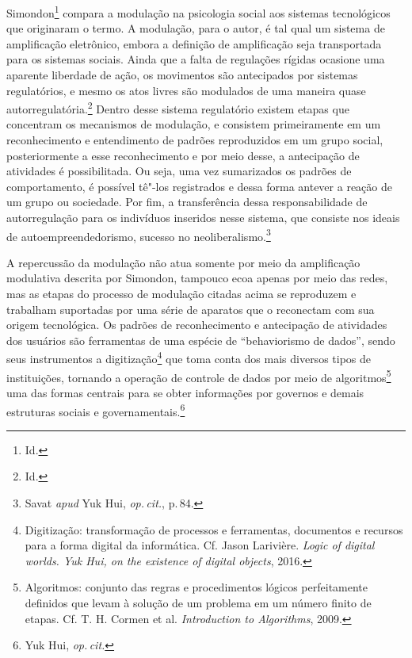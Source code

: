 Simondon\footnote{Id.} compara a modulação na psicologia social
aos sistemas tecnológicos que originaram o termo. A modulação, para o
autor, é tal qual um sistema de amplificação eletrônico, embora a
definição de amplificação seja transportada para os sistemas sociais.
Ainda que a falta de regulações rígidas ocasione uma aparente liberdade
de ação, os movimentos são antecipados por sistemas regulatórios, e
mesmo os atos livres são modulados de uma maneira quase autorregulatória.\footnote{Id.}
Dentro desse sistema regulatório existem etapas que
concentram os mecanismos de modulação, e consistem primeiramente em um
reconhecimento e entendimento de padrões reproduzidos em um grupo
social, posteriormente a esse reconhecimento e por meio desse, a
antecipação de atividades é possibilitada. Ou seja, uma vez sumarizados
os padrões de comportamento, é possível tê"-los registrados e dessa forma
antever a reação de um grupo ou sociedade. Por fim, a transferência
dessa responsabilidade de autorregulação para os indivíduos inseridos
nesse sistema, que consiste nos ideais de autoempreendedorismo, sucesso
no neoliberalismo.\footnote{Savat \emph{apud} Yuk Hui, \textit{op.\,cit.}, p.\,84.}

A repercussão da modulação não atua somente por meio da amplificação
modulativa descrita por Simondon, tampouco ecoa apenas por meio das
redes, mas as etapas do processo de modulação citadas acima se
reproduzem e trabalham suportadas por uma série de aparatos que o
reconectam com sua origem tecnológica. Os padrões de reconhecimento e
antecipação de atividades dos usuários são ferramentas de uma espécie de
``behaviorismo de dados'', sendo seus instrumentos a
digitização\footnote{Digitização: transformação de processos e
  ferramentas, documentos e recursos para a forma digital da informática. Cf. Jason Larivière. \emph{Logic of digital worlds. Yuk Hui, on the
existence of digital objects}, 2016.} que toma conta dos mais diversos tipos de
instituições, tornando a operação de controle de dados por meio de
algoritmos\footnote{Algoritmos: conjunto das regras e procedimentos
  lógicos perfeitamente definidos que levam à solução de um problema em
  um número finito de etapas. Cf. T. H. Cormen et al. \emph{Introduction to Algorithms}, 2009.} uma das formas centrais para se obter
informações por governos e demais estruturas sociais e governamentais.\footnote{Yuk Hui, \textit{op.\,cit.}}

